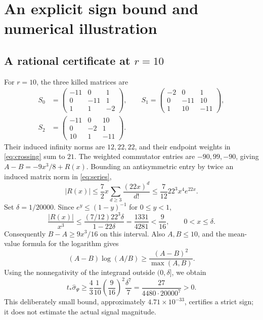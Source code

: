 \documentclass[11pt,a4paper]{article}
\newcommand{\ts}{t_*}
\newcommand{\sigw}{\widehat{\sigma}_{\Psi}}
\begin{document}
\section{An explicit sign bound and numerical illustration}
\subsection{A rational certificate at \texorpdfstring{$r=10$}{r=10}}
For $r=10$, the three killed matrices are
\begin{equation}
 \begin{split}
 S_0&=\begin{pmatrix}-11&0&1\\0&-11&1\\1&1&-2\end{pmatrix},\qquad
 S_1=\begin{pmatrix}-2&0&1\\0&-11&10\\1&10&-11\end{pmatrix},\\[3pt]
 S_2&=\begin{pmatrix}-11&0&10\\0&-2&1\\10&1&-11\end{pmatrix}.
 \end{split}
 \label{eq:matrices10}
\end{equation}
Their induced infinity norms are $12,22,22$, and their endpoint weights in \eqref{eq:crossing} sum to $21$. The weighted commutator entries are $-90,99,-90$, giving $A-B=-9x^3/8+R(x)$. Bounding an antisymmetric entry by twice an induced matrix norm in \eqref{eq:series},
\begin{equation}
 |R(x)|\le\frac72x\sum_{d\ge3}\frac{(22x)^d}{d!}
 \le\frac7{12}22^3x^4e^{22x}.
 \label{eq:remainder}
\end{equation}
Set $\delta=1/20000$. Since $e^y\le(1-y)^{-1}$ for $0\le y<1$,
\begin{equation}
 \frac{|R(x)|}{x^3}\le
 \frac{(7/12)22^3\delta}{1-22\delta}
 =\frac{1331}{4281}<\frac9{16},\qquad 0<x\le\delta.
 \label{eq:remainderconstant}
\end{equation}
Consequently $B-A\ge9x^3/16$ on this interval. Also $A,B\le10$, and the mean-value formula for the logarithm gives
\begin{equation}
 (A-B)\log(A/B)\ge\frac{(A-B)^2}{\max(A,B)}.
 \label{eq:logmv}
\end{equation}
Using the nonnegativity of the integrand outside $(0,\delta]$, we obtain
\begin{equation}
 \ts\sigw\ge\frac43\frac1{10}\left(\frac9{16}\right)^2\frac{\delta^7}{7}
 =\frac{27}{4480\cdot20000^7}>0.
 \label{eq:rational}
\end{equation}
This deliberately small bound, approximately $4.71\times10^{-33}$, certifies a strict sign; it does not estimate the actual signal magnitude.
\end{document}
